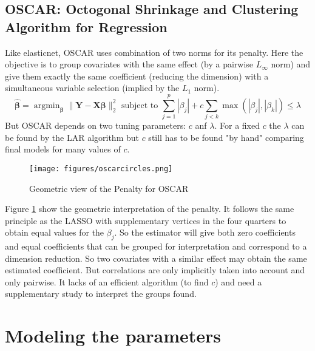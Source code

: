 \documentclass[12pt,a4paper]{report}
\begin{document}
	
		\subsection{OSCAR: Octogonal Shrinkage and Clustering Algorithm for Regression}		%

			Like elasticnet, \textsc{OSCAR} \cite{bondell2008simultaneous} uses combination of two norms for its penalty. Here the objective is to group covariates with the same effect (by a pairwise $L_\infty$ norm) and give them exactly the same coefficient (reducing the dimension) with a simultaneous variable selection (implied by the $L_1$ norm).
			\begin{equation}
				\hat{\boldsymbol{\beta}}=\operatorname{argmin}_{\boldsymbol{\beta}} \parallel\boldsymbol{Y}-\boldsymbol{X}\boldsymbol{\beta} \parallel^2_2 \textrm{ subject to } \sum_{j=1}^p|\beta_j|+c\sum_{j<k}\operatorname{max}(|\beta_j|,|\beta_k|) \leq \lambda		
			\end{equation}						
			But \textsc{OSCAR} depends on two tuning parameters: $c$ anf $\lambda$. For a fixed $c$ the $\lambda$ can be found by the \textsc{LAR} algorithm but $c$ still has to be found "by hand" comparing final models for many values of $c$.
			
\begin{figure}[h!]
			\centering
			\texttt{[image: figures/oscarcircles.png]} 
			\caption{Geometric view of the Penalty for OSCAR}\label{oscarcircles}
		\end{figure} 
Figure 	\ref{oscarcircles} show the geometric interpretation of the penalty. It follows the same principle as the LASSO with supplementary vertices in the four quarters to obtain equal values for the $\beta_j$. So the estimator will give both zero coefficients and equal coefficients that can be grouped for interpretation and correspond to a dimension reduction. So two covariates with a similar effect may obtain the same estimated coefficient. But correlations are only implicitly taken into account and only pairwise. It lacks of an efficient algorithm  (to find $c$) and need a supplementary study to interpret the groups found.
		
		
	\section{Modeling the parameters}			%
\end{document}

